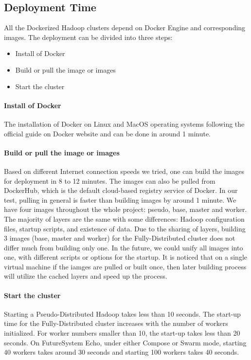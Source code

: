 \subsection{Deployment Time}

All the Dockerized Hadoop clusters depend on Docker Engine and 
corresponding images. The deployment can be divided into three steps:

\begin{itemize}
	\item Install of Docker
	\item Build or pull the image or images
	\item Start the cluster
\end{itemize}

\paragraph{Install of Docker}
	The installation of Docker on Linux and MacOS operating
	systems following the official guide on Docker website and can
	be done in around 1 minute.
	
\paragraph{Build or pull the image or images}	
	Based on different Internet connection speeds we tried, one
	can build the images for deployment in 8 to 12 minutes. The
	images can also be pulled from DockerHub, which is the default
	cloud-based registry service of Docker. In our test, pulling
	in general is faster than building images by around 1
	minute. We have four images throughout the whole project:
	pseudo, base, master and worker.  The majority of layers are
	the same with some differences: Hadoop configuration
	files, startup scripts, and existence of data. Due to the sharing of
	layers, building 3 images (base, master and worker) for the
	Fully-Distributed cluster does not differ much from building
	only one. In the future, we could unify all images into one,
	with different scripts or options for the startup. It is
	noticed that on a single virtual machine if the iamges are
	pulled or built once, then later building process will utilize
	the cached layers and speed up the process.
	
\paragraph{Start the cluster}
	Starting a Pseudo-Distributed Hadoop takes less than 10
	seconds. The start-up time for the Fully-Distributed cluster
	increases with the number of workers initialized. For worker
	numbers smaller than 10, the start-up takes less than 20
	seconds. On FutureSystem Echo, under either Compose or Swarm
	mode, starting 40 workers takes around 30 seconds and starting
	100 workers takes 40 seconds.


